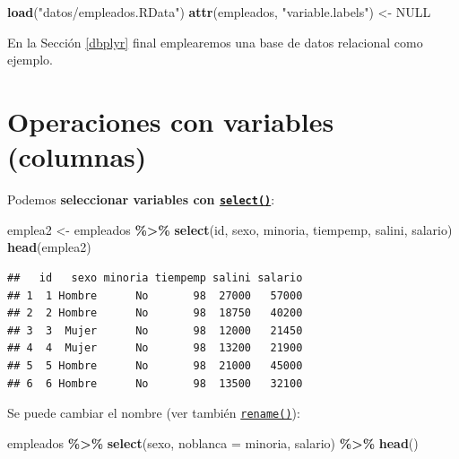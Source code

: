 \documentclass[
]{book}
\newenvironment{Shaded}{\begin{snugshade}}{\end{snugshade}}
\newcommand{\AttributeTok}[1]{\textcolor[rgb]{0.13,0.29,0.53}{#1}}
\newcommand{\ConstantTok}[1]{\textcolor[rgb]{0.56,0.35,0.01}{#1}}
\newcommand{\FunctionTok}[1]{\textcolor[rgb]{0.13,0.29,0.53}{\textbf{#1}}}
\newcommand{\NormalTok}[1]{#1}
\newcommand{\OtherTok}[1]{\textcolor[rgb]{0.56,0.35,0.01}{#1}}
\newcommand{\SpecialCharTok}[1]{\textcolor[rgb]{0.81,0.36,0.00}{\textbf{#1}}}
\newcommand{\StringTok}[1]{\textcolor[rgb]{0.31,0.60,0.02}{#1}}
\theoremstyle{break}
\theoremstyle{nonumberplain}
\begin{document}
\begin{Shaded}
\begin{Highlighting}[]
\FunctionTok{load}\NormalTok{(}\StringTok{"datos/empleados.RData"}\NormalTok{)}
\FunctionTok{attr}\NormalTok{(empleados, }\StringTok{"variable.labels"}\NormalTok{) }\OtherTok{\textless{}{-}} \ConstantTok{NULL}                  
\end{Highlighting}
\end{Shaded}

En la Sección \ref{dbplyr} final emplearemos una base de datos relacional como ejemplo.

\section{Operaciones con variables (columnas)}\label{dplyr-variables}

Podemos \textbf{seleccionar variables con \href{https://dplyr.tidyverse.org/reference/select.html}{\texttt{select()}}}:

\begin{Shaded}
\begin{Highlighting}[]
\NormalTok{emplea2 }\OtherTok{\textless{}{-}}\NormalTok{ empleados }\SpecialCharTok{\%\textgreater{}\%} \FunctionTok{select}\NormalTok{(id, sexo, minoria, tiempemp, salini, salario)}
\FunctionTok{head}\NormalTok{(emplea2)}
\end{Highlighting}
\end{Shaded}

\begin{verbatim}
##   id   sexo minoria tiempemp salini salario
## 1  1 Hombre      No       98  27000   57000
## 2  2 Hombre      No       98  18750   40200
## 3  3  Mujer      No       98  12000   21450
## 4  4  Mujer      No       98  13200   21900
## 5  5 Hombre      No       98  21000   45000
## 6  6 Hombre      No       98  13500   32100
\end{verbatim}

Se puede cambiar el nombre (ver también \href{https://dplyr.tidyverse.org/reference/rename.html}{\texttt{rename()}}):

\begin{Shaded}
\begin{Highlighting}[]
\NormalTok{empleados }\SpecialCharTok{\%\textgreater{}\%} \FunctionTok{select}\NormalTok{(sexo, }\AttributeTok{noblanca =}\NormalTok{ minoria, salario) }\SpecialCharTok{\%\textgreater{}\%} \FunctionTok{head}\NormalTok{()}
\end{Highlighting}
\end{Shaded}
\end{document}
